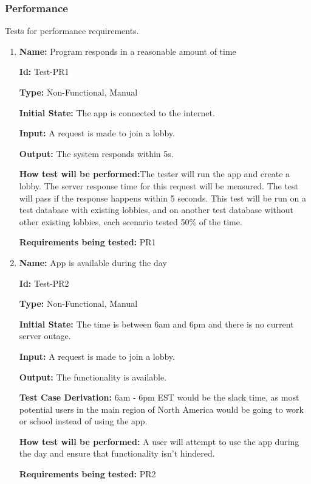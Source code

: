 \documentclass[12pt, titlepage]{article}
\begin{document}
\subsubsection{Performance}
Tests for performance requirements.

\begin{enumerate}

\item{\textbf{Name:} Program responds in a reasonable amount of time} \label{itm:Test-PR1}

\textbf{Id:} Test-PR1

\textbf{Type:} Non-Functional, Manual
					
\textbf{Initial State:} The app is connected to the internet. 
					
\textbf{Input:} A request is made to join a lobby.  
					
\textbf{Output:} The system responds within 5s.
					
\textbf{How test will be performed:}The tester will run the app and create a lobby. The server response time for this request will be measured. The test will pass if the response happens within 5 seconds. This test will be run on a test database with existing lobbies, and on another test database without other existing lobbies, each scenario tested 50\% of the time.

\textbf{Requirements being tested:} PR1

\item{\textbf{Name:} App is available during the day} \label{itm:Test-PR2}

\textbf{Id:} Test-PR2

\textbf{Type:} Non-Functional, Manual
					
\textbf{Initial State:} The time is between 6am and 6pm and there is no current server outage. 
					
\textbf{Input:} A request is made to join a lobby.  
					
\textbf{Output:} The functionality is available. 

\textbf{Test Case Derivation:} 6am - 6pm EST would be the slack time, as most potential users in the main region of North America would be going to work or school instead of using the app.
					
\textbf{How test will be performed:} A user will attempt to use the app during the day and ensure that functionality isn't hindered. 

\textbf{Requirements being tested:} PR2


\end{enumerate}
\end{document}
